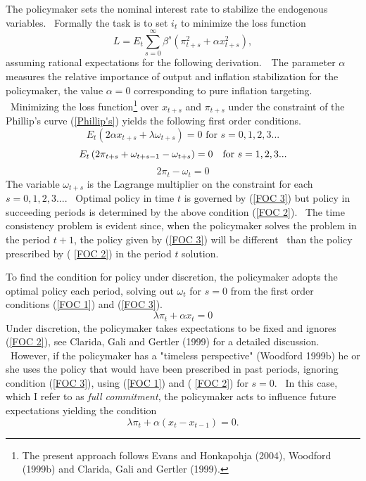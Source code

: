 \documentclass{article}
\providecommand{\dsum}{\displaystyle\sum}
\begin{document}
\begin{doublespace}
The policymaker sets the nominal interest rate to stabilize the endogenous
variables. \ Formally the task is to set $i_{t}$ to minimize the loss
function%
\begin{equation}
L=E_{t}\dsum\limits_{s=0}^{\infty }\beta ^{s}\left( \pi _{t+s}^{2}+\alpha
x_{t+s}^{2}\right) ,  \label{Loss}
\end{equation}%
assuming rational expectations for the following derivation.\ \ The
parameter $\alpha $ measures the relative importance of output and inflation
stabilization for the policymaker, the value $\alpha =0$ corresponding to
pure inflation targeting. \ Minimizing the loss function\footnote{%
The present approach follows Evans and Honkapohja (2004), Woodford (1999b)
and Clarida, Gali and Gertler (1999).} over $x_{t+s}$ and $\pi _{t+s}$ under
the constraint of the Phillip's curve (\ref{Phillip's}) yields the following
first order conditions.%
\begin{equation}
E_{t}\left( 2\alpha x_{t+s}+\lambda \omega _{t+s}\right) =0\text{ \ \ \ for }%
s=0,1,2,3...  \label{FOC 1}
\end{equation}%
\begin{equation}
E_{t}\left( 2\pi _{t+s}+\omega _{t+s-1}-\omega _{t+s}\right) =0\text{\ \ \
for }s=1,2,3...  \label{FOC 2}
\end{equation}%
\begin{equation}
2\pi _{t}-\omega _{t}=0  \label{FOC 3}
\end{equation}%
\qquad The variable $\omega _{t+s}$ is the Lagrange multiplier on the
constraint for each $s=0,1,2,3....$ \ Optimal policy in time $t$ is governed
by (\ref{FOC 3}) but policy in succeeding periods is determined by the above
condition (\ref{FOC 2}). \ The time consistency problem is evident since,
when the policymaker solves the problem in the period $t+1$, the policy
given by (\ref{FOC 3}) will be different \ than the policy prescribed by (%
\ref{FOC 2}) in the period $t$ solution.

To find the condition for policy under discretion, the policymaker adopts
the optimal policy each period, solving out $\omega _{t}$ for $s=0$ from the
first order conditions (\ref{FOC 1}) and (\ref{FOC 3}).%
\begin{equation}
\lambda \pi _{t}+\alpha x_{t}=0  \label{Discretion cond}
\end{equation}%
Under discretion, the policymaker takes expectations to be fixed and ignores
(\ref{FOC 2}), see Clarida, Gali and Gertler (1999) for a detailed
discussion. \ However, if the policymaker has a "timeless perspective"
(Woodford 1999b) he or she uses the policy that would have been prescribed
in past periods, ignoring condition (\ref{FOC 3}), using (\ref{FOC 1}) and (%
\ref{FOC 2}) for $s=0$. \ In this case, which I refer to as \textit{full
commitment}, the policymaker acts to influence future expectations yielding
the condition%
\begin{equation}
\lambda \pi _{t}+\alpha \left( x_{t}-x_{t-1}\right) =0.
\label{Commitment cond}
\end{equation}


\end{doublespace}
\end{document}
